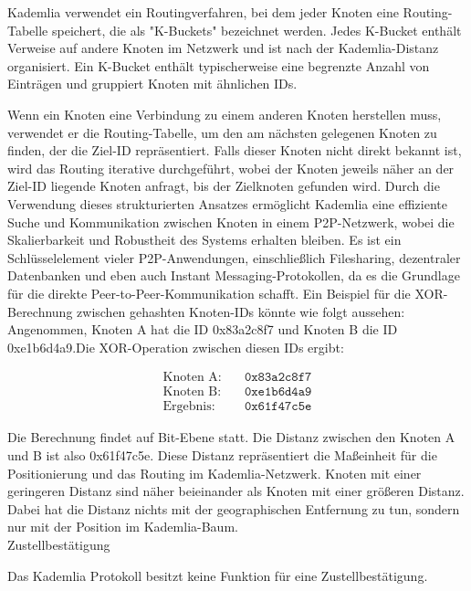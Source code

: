 Kademlia verwendet ein Routingverfahren, bei dem jeder Knoten eine Routing-\\
Tabelle 
speichert, die als "K-Buckets" bezeichnet werden. Jedes K-Bucket enthält Verweise 
auf andere Knoten im Netzwerk und ist nach der Kademlia-Distanz organisiert. Ein 
K-Bucket enthält typischerweise eine begrenzte Anzahl von Einträgen und gruppiert 
Knoten mit ähnlichen IDs.

Wenn ein Knoten eine Verbindung zu einem anderen Knoten herstellen muss, verwendet 
er die Routing-Tabelle, um den am nächsten gelegenen Knoten zu finden, der die 
Ziel-ID repräsentiert. Falls dieser Knoten nicht direkt bekannt ist, wird das 
Routing iterative durchgeführt, wobei der Knoten jeweils näher an der Ziel-ID 
liegende Knoten anfragt, bis der Zielknoten gefunden wird. Durch die Verwendung 
dieses strukturierten Ansatzes ermöglicht Kademlia eine effiziente Suche und 
Kommunikation zwischen Knoten in einem P2P-Netzwerk, wobei die Skalierbarkeit 
und Robustheit des Systems erhalten bleiben. Es ist ein Schlüsselelement vieler 
P2P-Anwendungen, einschließlich Filesharing, dezentraler Datenbanken und eben auch 
Instant Messaging-Protokollen, da es die Grundlage für die direkte 
Peer-to-Peer-Kommunikation schafft.
Ein Beispiel für die XOR-Berechnung zwischen gehashten Knoten-IDs könnte 
wie folgt aussehen:
Angenommen, Knoten A hat die ID 0x83a2c8f7 und Knoten B die ID 0xe1b6d4a9.Die XOR-Operation 
zwischen diesen IDs ergibt:

\begin{equation}
    \begin{aligned}
        \text{Knoten A:} & \quad \texttt{0x83a2c8f7} \\
        \text{Knoten B:} & \quad \texttt{0xe1b6d4a9} \\
        \text{Ergebnis:} & \quad \texttt{0x61f47c5e}
    \end{aligned}
\end{equation}

\noindent Die Berechnung findet auf Bit-Ebene statt. Die Distanz zwischen den Knoten A und B
ist also 0x61f47c5e.
Diese Distanz repräsentiert die Maßeinheit für die Positionierung und das Routing 
im Kademlia-Netzwerk. Knoten mit einer geringeren Distanz sind näher beieinander
als Knoten mit einer größeren Distanz. Dabei hat die Distanz nichts mit der
geographischen Entfernung zu tun, sondern nur mit der Position im Kademlia-Baum.
\\

\noindent Zustellbestätigung

\noindent Das Kademlia Protokoll besitzt keine Funktion für eine Zustellbestätigung.